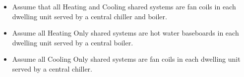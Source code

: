 \begin{itemize}
\item Assume that all Heating and Cooling shared systems are fan coils in each dwelling unit served by a central chiller and boiler.
\item Assume all Heating Only shared systems are hot water baseboards in each dwelling unit served by a central boiler.
\item Assume all Cooling Only shared systems are fan coils in each dwelling unit served by a central chiller.
\end{itemize}
